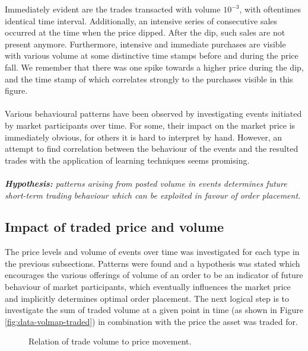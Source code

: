 Immediately evident are the trades transacted with volume $10^{-3}$, with oftentimes identical time interval.
Additionally, an intensive series of consecutive sales occurred at the time when the price dipped.
After the dip, such sales are not present anymore.
Furthermore, intensive and immediate purchases are visible with various volume at some distinctive time stamps before and during the price fall.
We remember that there was one spike towards a higher price during the dip, and the time stamp of which correlates strongly to the purchases visible in this figure.
\\
\\
Various behavioural patterns have been observed by investigating events initiated by market participants over time.
For some, their impact on the market price is immediately obvious, for others it is hard to interpret by hand.
However, an attempt to find correlation between the behaviour of the events and the resulted trades with the application of learning techniques seems promising.
\\
\\
\textit{\textbf{Hypothesis:} patterns arising from posted volume in events determines future short-term trading behaviour which can be exploited in favour of order placement.}

\subsection{Impact of traded price and volume}
\label{sec:data-hypthesis-trade-price-volume}

The price levels and volume of events over time was investigated for each type in the previous subsections.
Patterns were found and a hypothesis was stated which encourages the various offerings of volume of an order to be an indicator of future behaviour of market participants, which eventually influences the market price and implicitly determines optimal order placement.
The next logical step is to investigate the sum of traded volume at a given point in time (as shown in Figure \ref{fig:data-volmap-traded}) in combination with the price the asset was traded for.

\begin{figure}[H]
    \centering
    \caption{Relation of trade volume to price movement.}
    \label{fig:data-trade-volume}
\end{figure}

